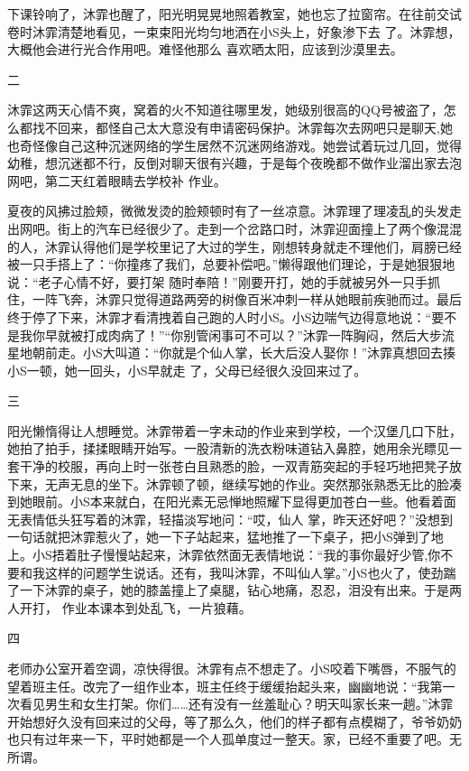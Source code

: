 \documentclass{article}
\begin{document}
下课铃响了，沐霏也醒了，阳光明晃晃地照着教室，她也忘了拉窗帘。在往前交试卷时沐霏清楚地看见，一束束阳光均匀地洒在小S头上，好象渗下去
\newpage
了。沐霏想，大概他会进行光合作用吧。难怪他那么
喜欢晒太阳，应该到沙漠里去。 


二 

沐霏这两天心情不爽，窝着的火不知道往哪里发，她级别很高的QQ号被盗了，怎么都找不回来，都怪自己太大意没有申请密码保护。沐霏每次去网吧只是聊天,她也奇怪像自己这种沉迷网络的学生居然不沉迷网络游戏。她尝试着玩过几回，觉得幼稚，想沉迷都不行，反倒对聊天很有兴趣，于是每个夜晚都不做作业溜出家去泡网吧，第二天红着眼睛去学校补
作业。 

夏夜的风拂过脸颊，微微发烫的脸颊顿时有了一丝凉意。沐霏理了理凌乱的头发走出网吧。街上的汽车已经很少了。走到一个岔路口时，沐霏迎面撞上了两个像混混的人，沐霏认得他们是学校里记了大过的学生，刚想转身就走不理他们，肩膀已经被一只手搭上了：“你撞疼了我们，总要补偿吧。”懒得跟他们理论，于是她狠狠地说：“老子心情不好，要打架
\newpage
随时奉陪！”刚要开打，她的手就被另外一只手抓住，一阵飞奔，沐霏只觉得道路两旁的树像百米冲刺一样从她眼前疾驰而过。最后终于停了下来，沐霏才看清拽着自己跑的人时小S。小S边喘气边得意地说：“要不是我你早就被打成肉病了！”“你别管闲事可不可以？”沐霏一阵胸闷，然后大步流星地朝前走。小S大叫道：“你就是个仙人掌，长大后没人娶你！”沐霏真想回去揍小S一顿，她一回头，小S早就走
了，父母已经很久没回来过了。 


三 

阳光懒惰得让人想睡觉。沐霏带着一字未动的作业来到学校，一个汉堡几口下肚，她拍了拍手，揉揉眼睛开始写。一股清新的洗衣粉味道钻入鼻腔，她用余光瞟见一套干净的校服，再向上时一张苍白且熟悉的脸，一双青筋突起的手轻巧地把凳子放下来，无声无息的坐下。沐霏顿了顿，继续写她的作业。突然那张熟悉无比的脸凑到她眼前。小S本来就白，在阳光素无忌惮地照耀下显得更加苍白一些。他看着面无表情低头狂写着的沐霏，轻描淡写地问：“哎，仙人
\newpage
掌，昨天还好吧？”没想到一句话就把沐霏惹火了，她一下子站起来，猛地推了一下桌子，把小S弹到了地上。小S捂着肚子慢慢站起来，沐霏依然面无表情地说：“我的事你最好少管,你不要和我这样的问题学生说话。还有，我叫沐霏，不叫仙人掌。”小S也火了，使劲踹了一下沐霏的桌子，她的膝盖撞上了桌腿，钻心地痛，忍忍，泪没有出来。于是两人开打，
作业本课本到处乱飞，一片狼藉。 


四 

老师办公室开着空调，凉快得很。沐霏有点不想走了。小S咬着下嘴唇，不服气的望着班主任。改完了一组作业本，班主任终于缓缓抬起头来，幽幽地说：“我第一次看见男生和女生打架。你们……还有没有一丝羞耻心？明天叫家长来一趟。”沐霏开始想好久没有回来过的父母，等了那么久，他们的样子都有点模糊了，爷爷奶奶也只有过年来一下，平时她都是一个人孤单度过一整天。家，已经不重要了吧。无
所谓。 
\end{document}
